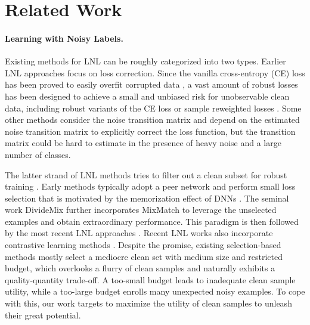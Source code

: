 \documentclass{article}
\begin{document}
\section{Related Work}

\paragraph{Learning with Noisy Labels.}
Existing methods for LNL can be roughly categorized into two types. Earlier LNL approaches focus on loss correction. Since the vanilla cross-entropy (CE) loss has been proved to easily overfit corrupted data \cite{DBLP:conf/iclr/ZhangBHRV17}, a vast amount of robust losses has been designed to achieve a small and unbiased risk for unobservable clean data, including  robust variants of the CE loss \cite{DBLP:conf/iccv/0001MCLY019,DBLP:conf/nips/XuCKW19,DBLP:conf/icml/MaH00E020} or sample reweighted losses \cite{DBLP:conf/nips/ShuXY0ZXM19,DBLP:conf/aaai/ZhengAD21}. Some other methods \cite{DBLP:conf/cvpr/PatriniRMNQ17,DBLP:conf/nips/XiaLW00NS19,DBLP:journals/corr/abs-2202-01273} consider the noise transition matrix and depend on the estimated noise transition matrix to explicitly correct the loss function, but the transition matrix could be hard to estimate in the presence of heavy noise and a large number of classes. 

The latter strand of LNL methods tries to filter out a clean subset for robust training \cite{DBLP:conf/iclr/LiSH20,DBLP:conf/cvpr/KarimRRMS22,DBLP:journals/pr/CordeiroSBRC23}. Early methods \cite{DBLP:conf/nips/HanYYNXHTS18,DBLP:conf/icml/JiangZLLF18,DBLP:conf/cvpr/WeiFC020} typically adopt a peer network and perform small loss selection that is motivated by the memorization effect of DNNs \cite{DBLP:conf/iclr/ZhangBHRV17}. The seminal work DivideMix \cite{DBLP:conf/iclr/LiSH20} further incorporates MixMatch \cite{DBLP:conf/nips/BerthelotCGPOR19} to leverage the unselected examples and obtain extraordinary performance. This paradigm is then followed by the most recent LNL approaches \cite{DBLP:conf/aistats/LiSO20,DBLP:conf/nips/LiuNRF20,DBLP:conf/nips/BaiYHYLMNL21,DBLP:conf/cvpr/KarimRRMS22}. Recent LNL works also incorporate contrastive learning methods \cite{DBLP:conf/cvpr/OrtegoAAOM21,DBLP:conf/cvpr/YaoSZS00T21}. Despite the promise, existing selection-based methods mostly select a mediocre clean set with medium size and restricted budget, which overlooks a flurry of clean samples and naturally exhibits a quality-quantity trade-off. A too-small budget leads to inadequate clean sample utility, while a too-large budget enrolls many unexpected noisy examples. To cope with this, our work targets to maximize the utility of clean samples to unleash their great potential.
\end{document}
